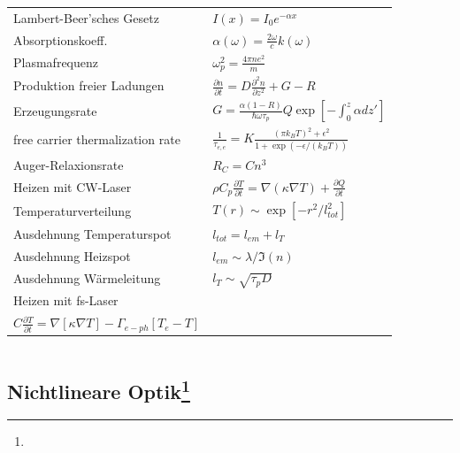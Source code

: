 \documentclass[12pt,a4paper]{article}
\newcommand{\pd}[2]{\frac{\partial #1}{\partial #2}}
\newcommand{\pdd}[2]{\frac{\partial^2 #1}{\partial #2^2}}
\renewcommand{\=}[1]{\stackrel{#1}{=}}
\theoremstyle{definition}
\theoremstyle{remark}
\begin{document}
\begin{center}
\begin{minipage}[t]{.5\linewidth}
\vspace{0pt}
\noindent\begin{tabular}{ll}
Lambert-Beer'sches Gesetz & $I(x) = I_0 e^{-\alpha x}$\\
Absorptionskoeff. & $\alpha(\omega) = \frac{2\omega}{c}k(\omega)$\\
Plasmafrequenz & $\omega_p^2 = \frac{4\pi n e^2}{m}$\\
Produktion freier Ladungen & $\pd{n}{t} = D \pdd{n}{z} + G - R$\\
Erzeugungsrate & $G = \frac{\alpha (1-R)}{\hbar \omega \tau_p} Q \exp[-\int_0^z \alpha dz']$\\
free carrier thermalization rate & $\frac{1}{\tau_{e,e}} = K \frac{(\pi k_B T)^2 + \epsilon^2}{1 + \exp(-\epsilon / (k_B T))}$\\
Auger-Relaxionsrate & $R_C = C n^3$\\
Heizen mit CW-Laser & $\rho C_p \pd{T}{t} = \nabla (\kappa \nabla T) + \pd{Q}{t}$\\
Temperaturverteilung & $T(r) \sim \exp[-r^2 / l_{tot}^2]$\\
Ausdehnung Temperaturspot & $l_{tot} = l_{em} + l_{T}$\\
Ausdehnung Heizspot & $l_{em} \sim \lambda / \Im(n)$\\
Ausdehnung Wärmeleitung & $l_{T} \sim \sqrt{\tau_p D}$\\

Heizen mit fs-Laser & \makecell[l]{$C_e \pd{T_e}{t} = \nabla [\kappa_e \nabla T_e] - \Gamma_{e-ph}[T_e - T] + Q$ \\ $C \pd{T}{t} = \nabla [\kappa \nabla T] - \Gamma_{e-ph} [T_e - T]$}\\


\end{tabular}
\end{minipage}%
\begin{minipage}[t]{.5\linewidth}
\vspace{0pt}
\begin{tabular}{ll}

\end{tabular}
\end{minipage}
\end{center}



\subsection[Nichtlineare Optik]{Nichtlineare Optik\let\thefootnote\relax\footnote{}}
\end{document}
